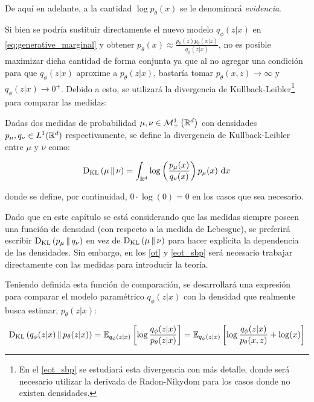 De aquí en adelante, a la cantidad $\log p_\theta(x)$ se le denominará \textit{evidencia}.

Si bien se podría sustituir directamente el nuevo modelo $q_\phi(z|x)$ en \eqref{eq:generative_marginal} y obtener $p_\theta(x)\approx\frac{p_\theta(z)p_\theta(x|z)}{q_\phi(z|x)}$, no es posible maximizar dicha cantidad de forma conjunta ya que al no agregar una condición para que $q_\phi(z|x)$ aproxime a $p_\theta(z|x)$, bastaría tomar $p_\theta(x,z)\to\infty$ y $q_\phi(z|x)\to 0^+$. Debido a esto, se utilizará la divergencia de Kullback-Leibler\footnote{En el \autoref{eot_sbp} se estudiará esta divergencia con más detalle, donde será necesario utilizar la derivada de Radon-Nikydom para los casos donde no existen densidades.} para comparar las medidas:

\begin{defn}
    \label{defn:kl_ac}
    Dadas dos medidas de probabilidad $\mu,\nu\in\mathcal{M}_+^1\left(\mathbb{R}^d\right)$ con densidades $p_\mu,q_\nu\in L^1(\mathbb{R}^d)$ respectivamente, se define la divergencia de Kullback-Leibler entre $\mu$ y $\nu$ como:

    \begin{equation}
        \operatorname{D_{KL}}\left(\mu\,\|\,\nu\right) = \int_{\mathbb{R}^d} \log\left(\frac{p_\mu(x)}{q_\nu(x)}\right)p_\mu(x) \,\operatorname{d}\! x
    \end{equation}

    donde se define, por continuidad, $0\cdot\log(0)=0$ en los casos que sea necesario.
\end{defn}

Dado que en este capítulo se está considerando que las medidas siempre poseen una función de densidad (con respecto a la medida de Lebesgue), se preferirá escribir $\operatorname{D_{KL}}\left(p_\mu\,\|\,q_\nu\right)$ en vez de $\operatorname{D_{KL}}\left(\mu\,\|\,\nu\right)$ para hacer explícita la dependencia de las densidades. Sin embargo, en los \autoref{ot} y \autoref{eot_sbp} será necesario trabajar directamente con las medidas para introducir la teoría.

Teniendo definida esta función de comparación, se desarrollará una expresión para comparar el modelo paramétrico $q_\phi(z|x)$ con la densidad que realmente busca estimar, $p_\theta(z|x)$:

\begin{equation}
    \operatorname{D_{KL}}\left(q_\phi(z|x)\,\|\,p_\theta(z|x)\right)
    = \mathbb{E}_{q_\phi(z|x)}\left[\log\frac{q_\phi(z|x)}{p_\theta(z|x)}\right]
    = \mathbb{E}_{q_\phi(z|x)}\left[\log\frac{q_\phi(z|x)}{p_\theta(x,z)} + \log(x)\right]
\end{equation}

